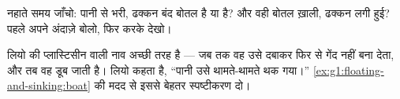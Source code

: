 \begin{exercise}[$\star$]\label{exo:g1:floating-and-sinking:8}
नहाते समय जाँचो: पानी से भरी, ढक्कन बंद बोतल  है या  है?
और वही बोतल ख़ाली, ढक्कन लगी हुई? पहले अपने अंदाज़े बोलो, फिर करके
देखो।
\end{exercise}

\begin{exercise}[$\star\star$]\label{exo:g1:floating-and-sinking:9}
लियो की प्लास्टिसीन वाली नाव अच्छी तरह  है --- जब तक वह उसे
दबाकर फिर से गेंद नहीं बना देता, और तब वह डूब जाती है। लियो कहता है,
``पानी उसे थामते-थामते थक गया।''
\cref{ex:g1:floating-and-sinking:boat} की मदद से इससे बेहतर
स्पष्टीकरण दो।
\end{exercise}
